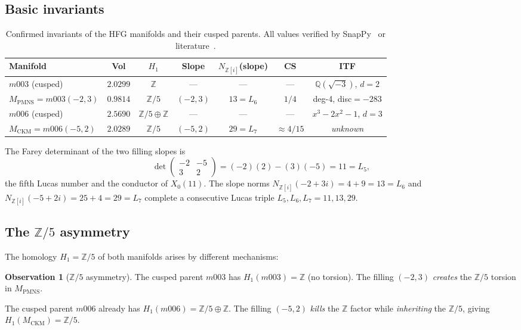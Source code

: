 \documentclass[11pt,a4paper]{article}
\theoremstyle{definition}
\newtheorem{observation}[theorem]{Observation}
\theoremstyle{remark}
\newcommand{\MPMNS}{M_{\mathrm{PMNS}}}
\newcommand{\MCKM}{M_{\mathrm{CKM}}}
\newcommand{\ZZ}{\mathbb{Z}}
\newcommand{\QQ}{\mathbb{Q}}
\newcommand{\Zfive}{\mathbb{Z}/5}
\newcommand{\Zi}{\mathbb{Z}[i]}
\begin{document}
\subsection{Basic invariants}

\begin{table}[htbp]
\centering
\caption{Confirmed invariants of the HFG manifolds and their
cusped parents. All values verified by SnapPy~\cite{SnapPy}
or literature~\cite{Meyerhoff87,Chinburg01,LongReid}.}
\label{tab:invariants}
\begin{tabular}{lcccccc}
\toprule
Manifold & Vol & $H_1$ & Slope & $N_{\Zi}$(slope) & CS & ITF \\
\midrule
$m003$ (cusped) & $2.0299$ & $\ZZ$ & --- & --- & --- & $\QQ(\sqrt{-3})$, $d{=}2$ \\
$\MPMNS = m003(-2,3)$ & $0.9814$ & $\Zfive$ & $(-2,3)$ & $13 = L_6$ & $1/4$ & deg-4, disc$=-283$ \\
\midrule
$m006$ (cusped) & $2.5690$ & $\Zfive\oplus\ZZ$ & --- & --- & --- & $x^3{-}2x^2{-}1$, $d{=}3$ \\
$\MCKM = m006(-5,2)$ & $2.0289$ & $\Zfive$ & $(-5,2)$ & $29 = L_7$ & $\approx4/15$ & \textit{unknown} \\
\bottomrule
\end{tabular}
\end{table}

The Farey determinant of the two filling slopes is
\begin{equation}
\det\begin{pmatrix}-2 & -5 \\ 3 & 2\end{pmatrix}
= (-2)(2) - (3)(-5) = 11 = L_5,
\end{equation}
the fifth Lucas number and the conductor of $X_0(11)$.
The slope norms $N_{\Zi}(-2+3i) = 4+9 = 13 = L_6$ and
$N_{\Zi}(-5+2i) = 25+4 = 29 = L_7$ complete a consecutive Lucas triple
$L_5, L_6, L_7 = 11, 13, 29$.

\subsection{The $\mathbb{Z}/5$ asymmetry}

The homology $H_1 = \Zfive$ of both manifolds arises by different mechanisms:

\begin{observation}[$\mathbb{Z}/5$ asymmetry]
\label{obs:asymm}
The cusped parent $m003$ has $H_1(m003) = \ZZ$ (no torsion).
The filling $(-2,3)$ \emph{creates} the $\Zfive$ torsion in $\MPMNS$.

The cusped parent $m006$ already has $H_1(m006) = \Zfive \oplus \ZZ$.
The filling $(-5,2)$ \emph{kills} the $\ZZ$ factor while \emph{inheriting}
the $\Zfive$, giving $H_1(\MCKM) = \Zfive$.
\end{observation}
\end{document}
